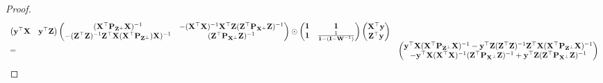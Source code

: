 \documentclass{amsart}[12pt]
\begin{document}
\begin{proof}
\begin{equation*}
\begin{array}{ll}
			\begin{pmatrix}
			{\bf y}^\top {\bf X}                                                           & {\bf y}^\top {\bf Z}                                                                                                                                                                                            
			\end{pmatrix}
			\begin{pmatrix}
			({\bf X}^\top {\bf P}_{{\bf Z}^\perp} {\bf X})^{-1}                                    & -({\bf X}^\top {\bf X})^{-1} {\bf X}^\top {\bf Z} ({\bf Z}^\top {\bf P}_{{\bf X}^\perp} {\bf Z})^{-1}                                                                                                                                   \\
			-({\bf Z}^\top {\bf Z})^{-1} {\bf Z}^\top {\bf X} ({\bf X}^\top {\bf P}_{{\bf Z}^\perp}) {\bf X})^{-1} & ({\bf Z}^\top {\bf P}_{{\bf X}^\perp} {\bf Z})^{-1}                                                                                                                                                                     
			\end{pmatrix}
			\odot
			\begin{pmatrix}
			{\bf1}                                                                  & {\bf 1}                                                                                                                                                                                                   \\
			{\bf 1}                                                                  & \frac{1}{{\bf 1} - ({\bf I} - {\bf W}^{-1})}                                                                                                                                                                      
			\end{pmatrix}
			\begin{pmatrix}
			{\bf X}^\top {\bf y}\\
			{\bf Z}^\top {\bf y}
			\end{pmatrix} \\
			=                                                                      &                                                                                                                                                                                                         
			\begin{pmatrix}
			{\bf y}^\top {\bf X}({\bf X}^\top {\bf P}_{{\bf Z}^\perp} {\bf X})^{-1} - {\bf y}^\top {\bf Z}({\bf Z}^\top {\bf Z})^{-1} {\bf Z}^\top {\bf X} ({\bf X}^\top {\bf P}_{{\bf Z}^\perp} {\bf X})^{-1}\\
			-{\bf y}^\top {\bf X}({\bf X}^\top {\bf X})^{-1} ({\bf Z}^\top {\bf P}_{{\bf X}^\perp} {\bf Z})^{-1} + {\bf y}^\top {\bf Z}({\bf Z}^\top {\bf P}_{{\bf X}^\perp} {\bf Z})^{-1}

\end{pmatrix}
\end{array}
\end{equation*}
\end{proof}
\end{document}
